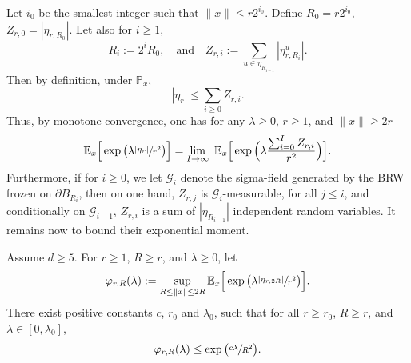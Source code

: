 Let $i_0$ be the smallest integer such that $\|x\|\le r2^{i_0}$.
Define $R_0 = r2^{i_0}$, $Z_{r,0}=|\eta_{r,R_0}|$. Let also for $i\ge 1$,
\begin{equation}\label{def-R}
R_i := 2^{i}R_0,\quad\text{and}\quad
Z_{r,i}:= \sum_{u\in \eta_{R_{i-1}} } |\eta^u_{r,R_i}|.
\end{equation}
Then by definition, under $\mathbb P_x$,
\begin{equation*}
|\eta_r| \le \sum_{i\ge 0} Z_{r,i}.
\end{equation*}
Thus, by monotone convergence, one has for any $\lambda\ge 0$, $r\ge 1$,
and $\|x\|\ge 2r$
\begin{equation}\label{link.etar.etari}
\mathbb E_x \Big[\exp\big(\lambda\sfrac{|\eta_r|}{r^2}\big)\Big]
=\lim_{I\to \infty} \ \mathbb E_x\Big[\exp\Big(\lambda\frac{\sum_{i=0}^I
Z_{r,i}}{r^2}\Big)\Big].
\end{equation}
Furthermore, if for $i\ge 0$, we let $\mathcal G_i$ denote the sigma-field
generated by the BRW frozen on $\partial B_{R_i}$, then
on one hand, $Z_{r,j}$ is $\mathcal G_i$-measurable, for all $j\le i$,
and conditionally on $\mathcal G_{i-1}$, $Z_{r,i}$
is a sum of $|\eta_{R_{i-1}}|$
independent random variables.
It remains now to bound their exponential moment.

\begin{proposition}\label{prop.phi.i}
Assume $d\ge 5$. For $r\ge 1$, $R\ge r$, and $\lambda\ge 0$, let
\begin{equation*}
\varphi_{r,R}(\lambda) := \sup_{R\le \|x\|\le 2R}
\mathbb E_x\Big[\exp\big(\lambda\sfrac{|\eta_{r,2R}|}{r^2}\big)\Big].
\end{equation*}
There exist positive constants $c$, $r_0$ and $\lambda_0$, such that for all $r\ge r_0$, $R\ge r$, and $\lambda\in[0,\lambda_0]$,
\begin{equation*}%
\varphi_{r,R}(\lambda) \le \exp\big(\sfrac{c\lambda}{R^2}\big).
\end{equation*}
\end{proposition}


